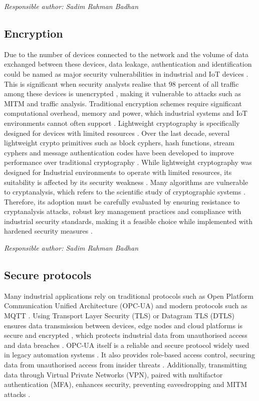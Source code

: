 \documentclass[conference]{IEEEtran}
\begin{document}
\textit{Responsible author: Sadim Rahman Badhan}
\subsection{Encryption }
Due to the number of devices connected to the network and the volume of data exchanged between these devices, data leakage, authentication and identification could be named as major security vulnerabilities in industrial and IoT devices \cite{b10}. This is significant when security analysts realise that 98 percent of all traffic among these devices is unencrypted \cite{b7}, making it vulnerable to attacks such as MITM and traffic analysis. 
Traditional encryption schemes require significant computational overhead, memory and power, which industrial systems and IoT environments cannot often support \cite{b10}. Lightweight cryptography is specifically designed for devices with limited resources \cite{b10}. Over the last decade, several lightweight crypto primitives such as block cyphers, hash functions, stream cyphers and message authentication codes have been developed to improve performance over traditional cryptography \cite{b10}.
While lightweight cryptography was designed for Industrial environments to operate with limited resources, its suitability is affected by its security weakness \cite{b10}. Many algorithms are vulnerable to cryptanalysis, which refers to the scientific study of cryptographic systems \cite{b10}. Therefore, its adoption must be carefully evaluated by ensuring resistance to cryptanalysis attacks, robust key management practices and compliance with industrial security standards, making it a feasible choice while implemented with hardened security measures \cite{b10}.


\textit{Responsible author: Sadim Rahman Badhan}
\subsection{Secure protocols}
 Many industrial applications rely on traditional protocols such as Open Platform Communication Unified Architecture (OPC-UA) and modern protocols such as MQTT \cite{b11}. Using Transport Layer Security (TLS) or Datagram TLS (DTLS) ensures data transmission between devices, edge nodes and cloud platforms is secure and encrypted \cite{b11}, which protects industrial data from unauthorised access and data breaches \cite{b11}. 
OPC-UA itself is a reliable and secure protocol widely used in legacy automation systems \cite{b11}. It also provides role-based access control, securing data from unauthorised access from insider threats \cite{b11}. Additionally, transmitting data through Virtual Private Networks (VPN), paired with multifactor authentication (MFA), enhances security, preventing eavesdropping and MITM attacks \cite{b5}.
\end{document}
